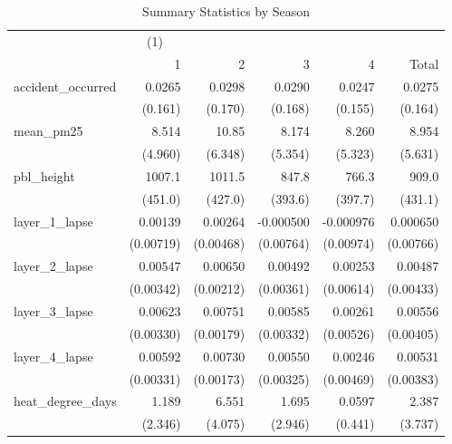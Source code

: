 \begin{table}[htbp]\centering
\caption{Summary Statistics by Season\label{sumstats\_season}}
\begin{tabular}{l*{5}{D{.}{.}{-1}}}
\toprule
                    &&            &            &            &            \\
                    &           1&           2&           3&           4&       Total\\
\midrule
accident\_occurred   &      0.0265&      0.0298&      0.0290&      0.0247&      0.0275\\
                    &     (0.161)&     (0.170)&     (0.168)&     (0.155)&     (0.164)\\
\addlinespace
mean\_pm25           &       8.514&       10.85&       8.174&       8.260&       8.954\\
                    &     (4.960)&     (6.348)&     (5.354)&     (5.323)&     (5.631)\\
\addlinespace
pbl\_height          &      1007.1&      1011.5&       847.8&       766.3&       909.0\\
                    &     (451.0)&     (427.0)&     (393.6)&     (397.7)&     (431.1)\\
\addlinespace
layer\_1\_lapse       &     0.00139&     0.00264&   -0.000500&   -0.000976&    0.000650\\
                    &   (0.00719)&   (0.00468)&   (0.00764)&   (0.00974)&   (0.00766)\\
\addlinespace
layer\_2\_lapse       &     0.00547&     0.00650&     0.00492&     0.00253&     0.00487\\
                    &   (0.00342)&   (0.00212)&   (0.00361)&   (0.00614)&   (0.00433)\\
\addlinespace
layer\_3\_lapse       &     0.00623&     0.00751&     0.00585&     0.00261&     0.00556\\
                    &   (0.00330)&   (0.00179)&   (0.00332)&   (0.00526)&   (0.00405)\\
\addlinespace
layer\_4\_lapse       &     0.00592&     0.00730&     0.00550&     0.00246&     0.00531\\
                    &   (0.00331)&   (0.00173)&   (0.00325)&   (0.00469)&   (0.00383)\\
\addlinespace
heat\_degree\_days    &       1.189&       6.551&       1.695&      0.0597&       2.387\\
                    &     (2.346)&     (4.075)&     (2.946)&     (0.441)&     (3.737)\\

\end{tabular}
\end{table}
